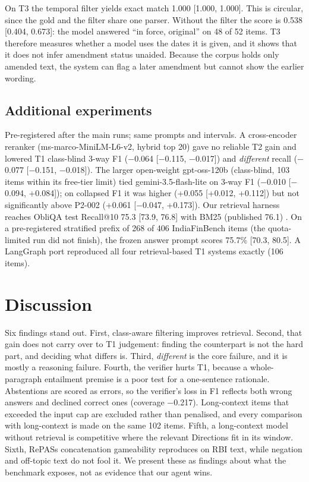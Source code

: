 \documentclass[conference]{IEEEtran}
\begin{document}
On T3 the temporal filter yields exact match 1.000 [1.000, 1.000]. This is circular, since the gold and the
filter share one parser. Without the filter the score is 0.538 [0.404, 0.673]: the model answered ``in force, original'' on
48 of 52 items. T3 therefore measures whether a model uses
the dates it is given, and it shows that it does not infer amendment status unaided. Because the corpus holds only amended text,
the system can flag a later amendment but cannot show the earlier wording.



\subsection{Additional experiments}
Pre-registered after the main runs; same prompts and intervals. A cross-encoder reranker (ms-marco-MiniLM-L6-v2, hybrid top 20)
gave no reliable T2 gain and lowered T1 class-blind 3-way F1 ($-$0.064 [$-$0.115, $-$0.017]) and \textit{different} recall
($-$0.077 [$-$0.151, $-$0.018]). The larger open-weight gpt-oss-120b \cite{gptoss} (class-blind, 103 items within its
free-tier limit) tied gemini-3.5-flash-lite on 3-way F1 ($-$0.010 [$-$0.094, +0.084]); on collapsed F1 it was higher
(+0.055 [+0.012, +0.112]) but not significantly above P2-002 (+0.061 [$-$0.047, +0.173]). Our retrieval harness reaches
ObliQA test Recall@10 75.3 [73.9, 76.8] with BM25 (published 76.1) \cite{gokhan2024regnlp}. On a pre-registered stratified
prefix of 268 of 406 IndiaFinBench items \cite{indiafinbench} (the quota-limited run did not finish), the frozen answer
prompt scores 75.7\% [70.3, 80.5]. A LangGraph port reproduced all four retrieval-based T1 systems exactly (106 items).

\section{Discussion}\label{sec:discussion}
Six findings stand out. First, class-aware filtering improves retrieval. Second, that gain does not carry over to T1 judgement:
finding the counterpart is not the hard part, and deciding what differs is. Third, \textit{different} is the core failure, and it is
mostly a reasoning failure. Fourth, the verifier hurts T1, because a whole-paragraph entailment premise is a poor test for a
one-sentence rationale. Abstentions are scored as errors, so the verifier's loss in F1 reflects both wrong answers and declined
correct ones (coverage $-$0.217). Long-context items
that exceeded the input cap are excluded rather than penalised, and every comparison with long-context is made on the same
102 items. Fifth, a long-context model without retrieval is competitive where the relevant Directions fit in its window.
Sixth, RePASs concatenation gameability reproduces on RBI text, while negation and off-topic text do not fool it. We present these as
findings about what the benchmark exposes, not as evidence that our agent wins.
\end{document}
